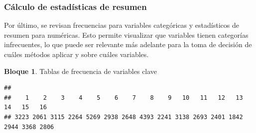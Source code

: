 \documentclass[]{book}
\newenvironment{Shaded}{\begin{snugshade}}{\end{snugshade}}
\newcommand{\KeywordTok}[1]{\textcolor[rgb]{0.13,0.29,0.53}{\textbf{#1}}}
\newcommand{\NormalTok}[1]{#1}
\newcommand{\OperatorTok}[1]{\textcolor[rgb]{0.81,0.36,0.00}{\textbf{#1}}}
\theoremstyle{definition}
\theoremstyle{definition}
\newtheorem{example}{Bloque}[chapter]
\theoremstyle{definition}
\theoremstyle{definition}
\theoremstyle{remark}
\begin{document}
\hypertarget{cuxe1lculo-de-estaduxedsticas-de-resumen}{%
\subsubsection{Cálculo de estadísticas de resumen}\label{cuxe1lculo-de-estaduxedsticas-de-resumen}}

Por último, se revisan frecuencias para variables categóricas y estadísticos de resumen para numéricas. Esto permite visualizar que variables tienen categorías infrecuentes, lo que puede ser relevante más adelante para la toma de decisión de cuáles métodos aplicar y sobre cuáles variables.

\begin{example}
\protect\hypertarget{exm:bloque36nbm}{}{\label{exm:bloque36nbm} }Tablas de frecuencia de variables clave
\end{example}

\begin{Shaded}
\end{Shaded}

\begin{verbatim}
## 
##    1    2    3    4    5    6    7    8    9   10   11   12   13   14   15   16 
## 3223 2061 3115 2264 5269 2938 2648 4393 2241 3138 2693 2401 1842 2944 3368 2806
\end{verbatim}

\begin{Shaded}
\end{Shaded}
\end{document}
